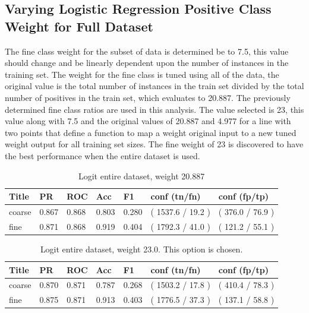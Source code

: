\documentclass[ms]{nuthesis}
\begin{document}
\subsection{Varying Logistic Regression Positive Class Weight for Full Dataset}
\par The fine class weight for the subset of data is determined be to 7.5, this value
should change and be linearly dependent upon the number of instances in the training set.
The weight for the fine class is tuned using all of the data, the original value is the total number
of instances in the train set divided by the total number of positives in the train set, which evaluates
to 20.887. The previously determined fine class ratios are used in this analysis. The value selected is
23, this value along with 7.5 and the original values of 20.887 and 4.977 for a line with two points that
define a function to map a weight original input to a new tuned weight output for all training set sizes.
The fine weight of 23 is discovered to have the best performance when the entire dataset is used.

\FloatBarrier
\begin{table}[H]
\centering
\caption{Logit entire dataset, weight 20.887}
\label{tab:LogRegAllOrig-Wt20p887}
\begin{tabular}{|l||l||l||l||l||l||l|}\toprule
Title & PR & ROC & Acc & F1 & conf (tn/fn) & conf (fp/tp) \\ \midrule
coarse & 0.867 & 0.868 & 0.803 & 0.280 & ( 1537.6 / 19.2 ) & ( 376.0 / 76.9 ) \\
fine & 0.871 & 0.868 & 0.919 & 0.404 & ( 1792.3 / 41.0 ) & ( 121.2 / 55.1 ) \\ \bottomrule
\end{tabular}
\end{table}
\FloatBarrier

\FloatBarrier
\begin{table}[H]
\centering
\caption{Logit entire dataset, weight 23.0. This option is chosen.}
\label{tab:LogRegAll-Wt23}
\begin{tabular}{|l||l||l||l||l||l||l|}\toprule
Title & PR & ROC & Acc & F1 & conf (tn/fn) & conf (fp/tp) \\ \midrule
coarse & 0.870 & 0.871 & 0.787 & 0.268 & ( 1503.2 / 17.8 ) & ( 410.4 / 78.3 ) \\
fine & 0.875 & 0.871 & 0.913 & 0.403 & ( 1776.5 / 37.3 ) & ( 137.1 / 58.8 ) \\ \bottomrule
\end{tabular}
\end{table}
\FloatBarrier
\end{document}
